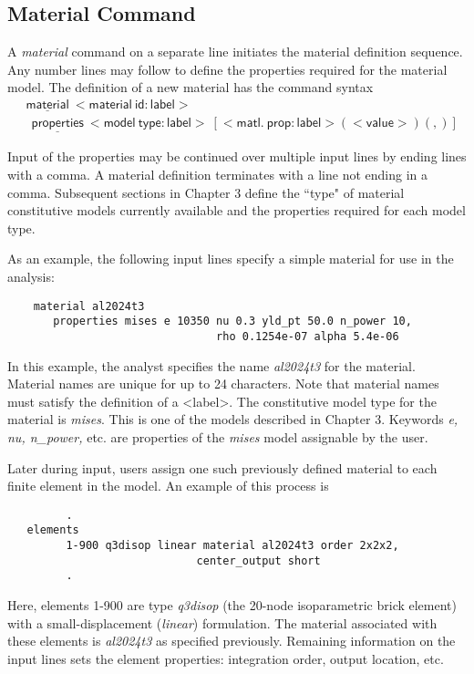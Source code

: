 \documentclass[11pt]{report}
\numberwithin{equation}{section}
\newcommand{\nin} {\noindent}
\newcommand{\ul} {\underline}
\newcommand{\hv} {\mathsf}   %
\newcommand{\ti}{\emph}
\begin{document}
\subsection{Material Command}
\nin
A \ti{material} command on a separate line initiates the material definition sequence.
 Any number lines may follow to define the properties required for the material
model. The definition of a new material has the command syntax
\begin{align*}
&\hv{\ul{material}\ <material\ id:label>} \\
&\hv{\ \ \ul{properties}\ <model\ type:label>\ [ <matl.\ prop:label>(<value>) (,)]}
\end{align*} 

\nin Input of the properties may be continued over multiple input lines by ending
lines with a comma. A material definition terminates with a line not ending in
a comma. Subsequent sections in Chapter 3 define the ``type" of
material constitutive models currently available and the properties required for
each model type. 

As an example, the following input lines specify a simple material for use in
the analysis: 
\small
\begin{verbatim}
    material al2024t3
       properties mises e 10350 nu 0.3 yld_pt 50.0 n_power 10,
                                rho 0.1254e-07 alpha 5.4e-06
\end{verbatim}
\normalsize

\nin In this example, the analyst specifies the name \ti{al2024t3} for the material.
Material names are unique for up to 24 characters. Note that
material names must satisfy the
definition of a \textless label\textgreater. The constitutive model type for the material
is \ti{mises}. This is one of the models described in Chapter 3. 
Keywords \ti{e, nu, n\_power,} etc.
are properties of the \ti{mises} model assignable by the user.

Later during input, users assign one such previously defined material to each
finite element in the model. An example of this process is 

\small
\begin{verbatim}
         .
   elements
         1-900 q3disop linear material al2024t3 order 2x2x2,
                             center_output short
         .
\end{verbatim}
\normalsize

\nin Here, elements 1-900 are type \ti{q3disop} (the 20-node
isoparametric brick element) with a small-displacement (\ti{linear}) formulation.
The material associated with these elements is \ti{al2024t3} as specified
previously. Remaining information on the input lines sets the element 
properties: integration order, output location, etc.
\end{document}
